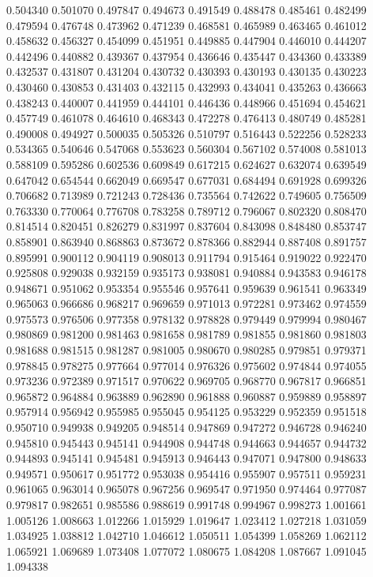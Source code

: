 0.504340
0.501070
0.497847
0.494673
0.491549
0.488478
0.485461
0.482499
0.479594
0.476748
0.473962
0.471239
0.468581
0.465989
0.463465
0.461012
0.458632
0.456327
0.454099
0.451951
0.449885
0.447904
0.446010
0.444207
0.442496
0.440882
0.439367
0.437954
0.436646
0.435447
0.434360
0.433389
0.432537
0.431807
0.431204
0.430732
0.430393
0.430193
0.430135
0.430223
0.430460
0.430853
0.431403
0.432115
0.432993
0.434041
0.435263
0.436663
0.438243
0.440007
0.441959
0.444101
0.446436
0.448966
0.451694
0.454621
0.457749
0.461078
0.464610
0.468343
0.472278
0.476413
0.480749
0.485281
0.490008
0.494927
0.500035
0.505326
0.510797
0.516443
0.522256
0.528233
0.534365
0.540646
0.547068
0.553623
0.560304
0.567102
0.574008
0.581013
0.588109
0.595286
0.602536
0.609849
0.617215
0.624627
0.632074
0.639549
0.647042
0.654544
0.662049
0.669547
0.677031
0.684494
0.691928
0.699326
0.706682
0.713989
0.721243
0.728436
0.735564
0.742622
0.749605
0.756509
0.763330
0.770064
0.776708
0.783258
0.789712
0.796067
0.802320
0.808470
0.814514
0.820451
0.826279
0.831997
0.837604
0.843098
0.848480
0.853747
0.858901
0.863940
0.868863
0.873672
0.878366
0.882944
0.887408
0.891757
0.895991
0.900112
0.904119
0.908013
0.911794
0.915464
0.919022
0.922470
0.925808
0.929038
0.932159
0.935173
0.938081
0.940884
0.943583
0.946178
0.948671
0.951062
0.953354
0.955546
0.957641
0.959639
0.961541
0.963349
0.965063
0.966686
0.968217
0.969659
0.971013
0.972281
0.973462
0.974559
0.975573
0.976506
0.977358
0.978132
0.978828
0.979449
0.979994
0.980467
0.980869
0.981200
0.981463
0.981658
0.981789
0.981855
0.981860
0.981803
0.981688
0.981515
0.981287
0.981005
0.980670
0.980285
0.979851
0.979371
0.978845
0.978275
0.977664
0.977014
0.976326
0.975602
0.974844
0.974055
0.973236
0.972389
0.971517
0.970622
0.969705
0.968770
0.967817
0.966851
0.965872
0.964884
0.963889
0.962890
0.961888
0.960887
0.959889
0.958897
0.957914
0.956942
0.955985
0.955045
0.954125
0.953229
0.952359
0.951518
0.950710
0.949938
0.949205
0.948514
0.947869
0.947272
0.946728
0.946240
0.945810
0.945443
0.945141
0.944908
0.944748
0.944663
0.944657
0.944732
0.944893
0.945141
0.945481
0.945913
0.946443
0.947071
0.947800
0.948633
0.949571
0.950617
0.951772
0.953038
0.954416
0.955907
0.957511
0.959231
0.961065
0.963014
0.965078
0.967256
0.969547
0.971950
0.974464
0.977087
0.979817
0.982651
0.985586
0.988619
0.991748
0.994967
0.998273
1.001661
1.005126
1.008663
1.012266
1.015929
1.019647
1.023412
1.027218
1.031059
1.034925
1.038812
1.042710
1.046612
1.050511
1.054399
1.058269
1.062112
1.065921
1.069689
1.073408
1.077072
1.080675
1.084208
1.087667
1.091045
1.094338
